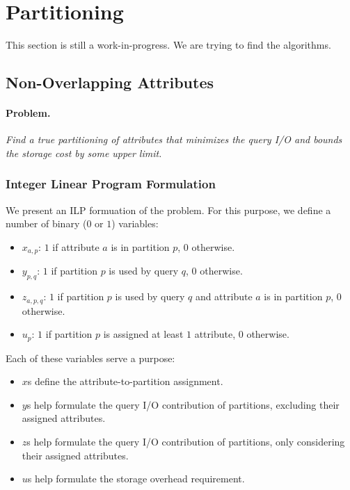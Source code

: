 \clearpage
\newpage
\section{Partitioning}
This section is still a work-in-progress. We are trying to find the algorithms.

\subsection{Non-Overlapping Attributes}

\paragraph*{Problem.$\,$} \emph{Find a true partitioning of attributes that
minimizes the query I/O and bounds the storage cost by some upper limit.}

\subsubsection{Integer Linear Program Formulation}\label{subsubsec:nov-ilp}
We present an ILP formuation of the problem. For this purpose, we define a 
number of binary ($0$ or $1$) variables: 
\begin{itemize}
\item $x_{a,p}$: $1$ if attribute $a$ is in partition $p$, $0$ otherwise.
\item $y_{p,q}$: $1$ if partition $p$ is used by query $q$, $0$ otherwise.
\item $z_{a,p,q}$: $1$ if partition $p$ is used by query $q$ and attribute $a$
is in partition $p$, $0$ otherwise.
\item $u_{p}$: $1$ if partition $p$ is assigned at least $1$ attribute, $0$ otherwise.
\end{itemize}

Each of these variables serve a purpose:
\begin{itemize}
\item $x$s define the attribute-to-partition assignment.
\item $y$s help formulate the query I/O contribution
of partitions, excluding their assigned attributes.
\item $z$s help formulate the query I/O contribution
of partitions, only considering their assigned attributes.
\item $u$s help formulate the storage overhead requirement.
\end{itemize}

